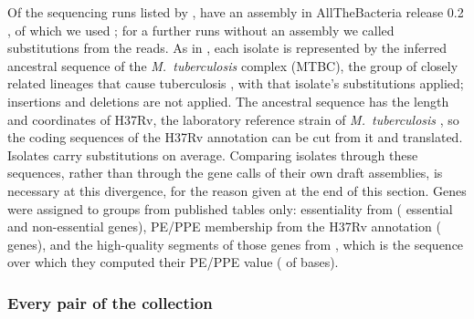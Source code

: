 Of the \mtbRunsGan{} sequencing runs listed by \citet{gan2025}, \mtbWithAssembly{} have an assembly
in AllTheBacteria release 0.2 \citep{hunt2024}, of which we used \mtbAssemblyIsolates{}; for a further
\mtbReadIsolates{} runs without an assembly we called substitutions from the reads. As in
\citet{gan2025}, each isolate is represented by the inferred ancestral sequence of the
\textit{M.\ tuberculosis} complex (MTBC), the group of closely related lineages that cause
tuberculosis \citep{comas2010,comas2013}, with that isolate's substitutions applied; insertions and
deletions are not applied. The ancestral sequence has the length and coordinates of H37Rv, the
laboratory reference strain of \textit{M.\ tuberculosis} \citep{cole1998}, so the coding sequences
of the H37Rv annotation can be cut from it and translated. Isolates carry \mtbMeanSubstitutions{}
substitutions on average. Comparing isolates through these sequences, rather than through the gene
calls of their own draft assemblies, is necessary at this divergence, for the reason given at the end
of this section. Genes were assigned to groups from published tables only: essentiality from
\citet{dejesus2017} (\mtbGenesEssential{} essential and \mtbGenesNonessential{} non-essential genes),
PE/PPE membership from the H37Rv annotation (\mtbGenesPeppe{} genes), and the high-quality segments
of those genes from \citet{gan2025}, which is the sequence over which they computed their PE/PPE value
(\mtbBasesPeppehq{} of \mtbBasesPeppe{} bases).

\subsubsection*{Every pair of the collection}

